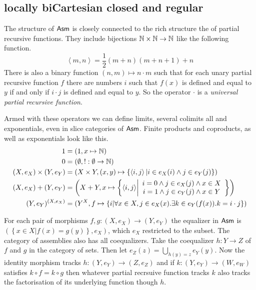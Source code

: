 \documentclass{amsart}
\theoremstyle{plain}
\theoremstyle{definition}
\newcommand\hide[1]{}
\newcommand\set[1]{\left\{#1\right\}}
\begin{document}
\subsection{locally biCartesian closed and regular}
\newcommand\pair[2]{\left\langle #1,#2\right\rangle}
The structure of $\mathsf{Asm}$ is closely connected to the rich structure the of partial recursive functions.
They include bijections $\mathbb N\times \mathbb N\to \mathbb N$ like the following function.
\[ \pair mn = \frac12(m+n)(m+n+1)+n\]
There is also a binary function $(n,m)\mapsto n\cdot m$ such that for each unary partial recursive function $f$ there are numbers $i$ such that $f(x)$ is defined and equal to $y$ if and only if $i\cdot j$ is defined and equal to $y$. So the operator $\cdot$ is a \emph{universal partial recursive function}.

Armed with these operators we can define limits, several colimits all and exponentials, even in slice categories of $\mathsf{Asm}$. Finite products and coproducts, as well as exponentials look like this.
\begin{align*}
1 &= (1,x\mapsto \N)\\
0 &= (\emptyset,!:\emptyset\to \N)\\
(X,e_X)\times (Y,e_Y) &= (X\times Y, (x,y) \mapsto \set{\pair ij|i\in e_X(i)\land j\in e_Y(j)})\\
(X,e_X)+(Y,e_Y) &= \left(X + Y, x \mapsto \set{\pair ij\middle|\begin{array}{c} i=0\land j\in e_X(j) \land x\in X \\ i=1\land j\in e_Y(j) \land x\in Y\end{array}}\right)\\
(Y,e_Y)^{(X,e_X)} &= (Y^X , f\mapsto \set{i|\forall x\in X, j\in e_X(x).\exists k\in e_Y(f(x)). k=i\cdot j } )
\end{align*}

For each pair of morphisms $f,g:(X,e_X)\to(Y,e_Y)$ the equalizer in $\mathsf{Asm}$ is $(\set{x\in X|f(x)=g(y)}, e_X)$, which $e_X$ restricted to the subset. The category of assemblies also has all coequalizers. Take the coequalizer $h:Y\to Z$ of $f$ and $g$ in the category of sets. Then let $e_Z(z) = \bigcup_{h(y)=z}e_Y(y)$. Now the identity morphism tracks $h:(Y,e_Y) \to (Z,e_Z)$ and if $k:(Y,e_Y)\to (W,e_W)$ satisfies $k\circ f = k\circ g$ then whatever partial recrsuive function tracks $k$ also tracks the factorisation of its underlying function though $h$.

\hide{Bij $\nabla$ heel goed uitleggen wat het verschil is tussen regular en coequalizer behoudend.}
\end{document}
